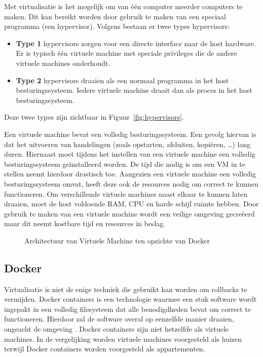 Met virtualisatie is het mogelijk om van één computer meerder computers te maken.
Dit kan bereikt worden door gebruik te maken van een speciaal programma (een hypervisor).
Volgens \citet{fenn2008evaluation} bestaan er twee types hypervisors:
\begin{itemize}
\item \textbf{Type 1} hypervisors zorgen voor een directe interface naar de host hardware.
Er is typisch één virtuele machine met speciale privileges die de andere virtuele machines onderhoudt.
\item \textbf{Type 2} hypervisors draaien als een normaal programma in het host besturingssysteem.
Iedere virtuele machine draait dan als proces in het host besturingssysteem.
\end{itemize}
Deze twee types zijn zichtbaar in Figuur~\vref{fig:hypervisors}.

Een virtuele machine bevat een volledig besturingssysteem.
Een gevolg hiervan is dat het uitvoeren van handelingen (zoals opstarten, afsluiten, kopiëren, \ldots) lang duren.
Hiernaast moet tijdens het instellen van een virtuele machine een volledig besturingssysteem geïnstalleerd worden.
De tijd die nodig is om een VM in te stellen neemt hierdoor drastisch toe.
Aangezien een virtuele machine een volledig besturingssysteem omvat, heeft deze ook de resources nodig om correct te kunnen functioneren.
Om verschillende virtuele machines naast elkaar te kunnen laten draaien, moet de host voldoende RAM, CPU en harde schijf ruimte hebben.
Door gebruik te maken van een virtuele machine wordt een veilige omgeving gecreëerd maar dit neemt kostbare tijd en resources in beslag.

\begin{figure}[!ht]
\centering
{}
\caption{Architectuur van Virtuele Machine ten opzichte van Docker \citep{dockerMain}}
\label{fig:VMvsDocker}
\end{figure}

\subsection{Docker}\label{sec:docker}
Virtualisatie is niet de enige techniek die gebruikt kan worden om rollbacks te vermijden.
Docker containers is een technologie waarmee een stuk software wordt ingepakt in een volledig filesysteem dat alle benodigdheden bevat om correct te functioneren.
Hierdoor zal de software overal op eenzelfde manier draaien, ongeacht de omgeving \citep{dockerMain}.
Docker containers zijn niet hetzelfde als virtuele machines.
In de vergelijking \citep{dockerEbook} worden virtuele machines voorgesteld als huizen terwijl Docker containers worden voorgesteld als appartementen.

